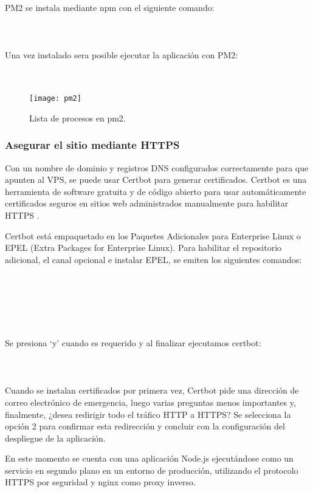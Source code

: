 PM2 se instala mediante npm con el siguiente comando:\\
\\
\\
\\
Una vez instalado sera posible ejecutar la aplicación con PM2:\\
\\
\\

\begin{figure}[H]
  \centering
  \texttt{[image: pm2]}
  \caption{Lista de procesos en pm2.}
\end{figure}

\subsubsection{Asegurar el sitio mediante HTTPS}
Con un nombre de dominio y registros DNS configurados correctamente para que apunten al VPS, se puede usar Certbot para generar certificados. Certbot es una herramienta de software gratuita y de código abierto para usar automáticamente certificados seguros en sitios web administrados manualmente para habilitar HTTPS \cite{certbot}.
\vspace{0.8cm}

Certbot está empaquetado en los Paquetes Adicionales para Enterprise Linux o EPEL (Extra Packages for Enterprise Linux). Para habilitar el repositorio adicional, el canal opcional e instalar EPEL, se emiten los siguientes comandos:\\
\\
\\
\\
\\
\\
\\
Se presiona `y' cuando es requerido y al finalizar ejecutamos certbot:\\
\\
\\
\\
Cuando se instalan certificados por primera vez, Certbot pide una dirección de correo electrónico de emergencia, luego varias preguntas menos importantes y, finalmente, ¿desea redirigir todo el tráfico HTTP a HTTPS? Se selecciona la opción 2 para confirmar esta redirección y concluir con la configuración del despliegue de la aplicación.
\vspace{0.8cm}

En este momento se cuenta con una aplicación Node.js ejecutándose como un servicio en segundo plano en un entorno de producción, utilizando el protocolo HTTPS por seguridad y nginx como proxy inverso.
